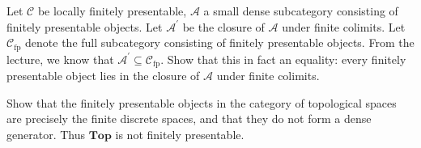 \documentclass[12pt, a4paper]{article}
\DeclareMathOperator{\fp}{fp}
\newcommand{\ca}[1]{\mathscr{#1}}
\theoremstyle{plain}
\theoremstyle{definition}
\theoremstyle{citing}
\theoremstyle{citingdfn}
\numberwithin{equation}{section}
\begin{document}
\begin{question}
 Let $\ca{C}$ be locally finitely presentable, $\ca{A}$ a small dense subcategory consisting of finitely presentable objects. Let $\ca{A}^{\prime}$ be the closure of $\ca{A}$ under finite colimits. Let $\ca{C}_{\fp}$ denote the full subcategory consisting of finitely presentable objects. From the lecture, we know that $\ca{A}^{\prime} \subseteq \ca{C}_{\fp}$. Show that this in fact an equality: every finitely presentable object lies in the closure of $\ca{A}$ under finite colimits. 
\end{question}

\begin{question}[subtitle=(bonus)]
 Show that the finitely presentable objects in the category of topological spaces are precisely the finite discrete spaces, and that they do not form a dense generator. Thus $\mathbf{Top}$ is not finitely presentable.
\end{question}
\end{document}
